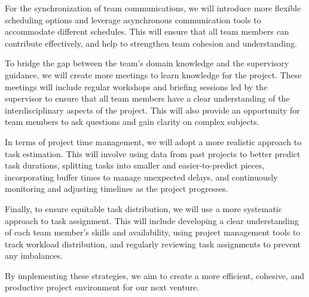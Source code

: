 \documentclass{article}
\begin{document}
For the synchronization of team communications, we will introduce more flexible scheduling options and leverage asynchronous communication tools to accommodate different schedules. This will ensure that all team members can contribute effectively, and help to strengthen team cohesion and understanding.

To bridge the gap between the team’s domain knowledge and the supervisory guidance, we will create more meetings to learn knowledge for the project. These meetings will include regular workshops and briefing sessions led by the supervisor to ensure that all team members have a clear understanding of the interdisciplinary aspects of the project. This will also provide an opportunity for team members to ask questions and gain clarity on complex subjects.

In terms of project time management, we will adopt a more realistic approach to task estimation. This will involve using data from past projects to better predict task durations, splitting tasks into smaller and easier-to-predict pieces, incorporating buffer times to manage unexpected delays, and continuously monitoring and adjusting timelines as the project progresses.

Finally, to ensure equitable task distribution, we will use a more systematic approach to task assignment. This will include developing a clear understanding of each team member’s skills and availability, using project management tools to track workload distribution, and regularly reviewing task assignments to prevent any imbalances.

By implementing these strategies, we aim to create a more efficient, cohesive, and productive project environment for our next venture.
\end{document}
